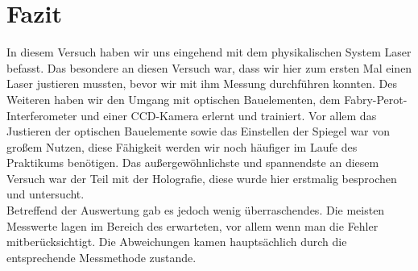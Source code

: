 
\chapter{Fazit}
In diesem Versuch haben wir uns eingehend mit dem physikalischen System Laser befasst.
Das besondere an diesen Versuch war, dass wir hier zum ersten Mal einen Laser justieren mussten, bevor wir mit ihm Messung durchführen konnten.
Des Weiteren haben wir den Umgang mit optischen Bauelementen, dem Fabry-Perot-Interferometer und einer CCD-Kamera erlernt und trainiert. Vor allem das Justieren der optischen Bauelemente sowie das Einstellen der Spiegel war von großem Nutzen, diese Fähigkeit werden wir noch häufiger im Laufe des Praktikums benötigen.
Das außergewöhnlichste und spannendste an diesem Versuch war der Teil mit der Holografie, diese wurde hier erstmalig besprochen und untersucht.\\
Betreffend der Auswertung gab es jedoch wenig überraschendes. Die meisten Messwerte lagen im Bereich des erwarteten, vor allem wenn man die Fehler mitberücksichtigt. Die Abweichungen kamen hauptsächlich durch die entsprechende Messmethode zustande.
